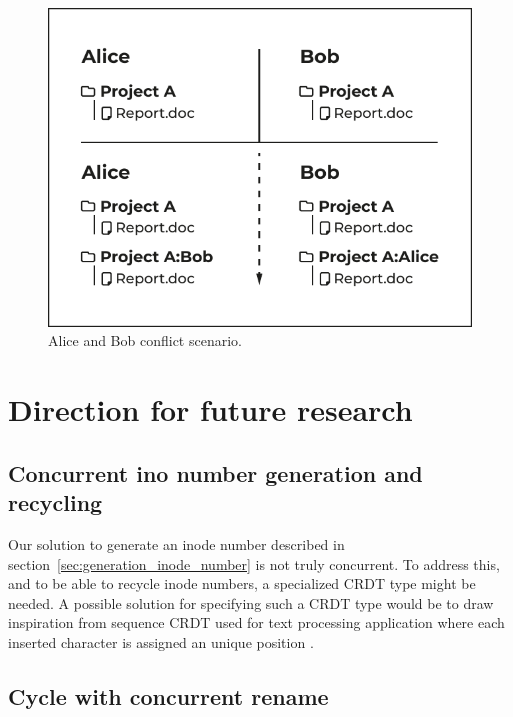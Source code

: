 \documentclass[sigconf,anonymous,10pt]{acmart}
\begin{document}
\begin{figure}[h]
	\caption{Alice and Bob conflict scenario.}
	\centering
	\includegraphics[scale=0.5]{AliceBob-font-des-fichiers.pdf}
\end{figure}

\section{Direction for future research}
\label{crdt:future}

\subsection{Concurrent ino number generation and recycling}

Our solution to generate an inode number described in section~\ref{sec:generation_inode_number}
is not truly concurrent.
To address this, and to be able to recycle inode numbers,
a specialized CRDT type might be needed.
A possible solution for specifying such a CRDT type would be to draw inspiration
from sequence CRDT used for text processing application where each inserted
character is assigned an unique position \cite{nedelec2013lseq, letia2009crdts}.

\subsection{Cycle with concurrent rename}
\end{document}
